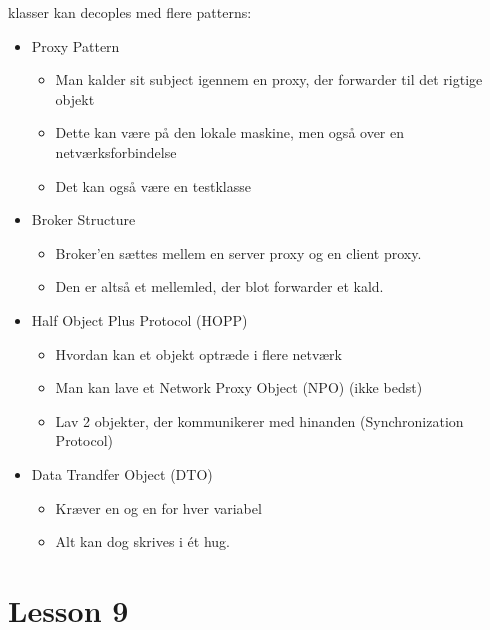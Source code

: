 \documentclass[oneside, 10pt]{memoir}
\begin{document}
  klasser kan decoples med flere patterns:
\begin{itemize}
	
	\item Proxy Pattern
	\begin{itemize}
		\item Man kalder sit subject igennem en proxy, der forwarder til det rigtige objekt
		\item Dette kan være på den lokale maskine, men også over en netværksforbindelse
		\item Det kan også være en testklasse
	\end{itemize}

	\item Broker Structure
	\begin{itemize}
		\item Broker'en sættes mellem en server proxy og en client proxy.
		\item Den er altså et mellemled, der blot forwarder et kald.
	\end{itemize}

	\item Half Object Plus Protocol (HOPP)
	\begin{itemize}
		\item Hvordan kan et objekt optræde i flere netværk
		\item Man kan lave et Network Proxy Object (NPO) (ikke bedst)
		\item Lav 2 objekter, der kommunikerer med hinanden (Synchronization Protocol)
	\end{itemize}

	\item Data Trandfer Object (DTO)
	\begin{itemize}
		\item Kræver en  og en  for hver variabel
		\item Alt kan dog skrives i ét hug.
	\end{itemize}
\end{itemize}


\newpage
\section*{Lesson 9}
\end{document}
